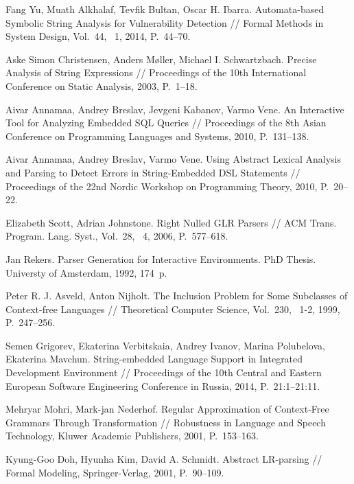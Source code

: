 \documentclass{llncs}
\begin{document}








%
%
\begin{thebibliography}{}
%
Fang Yu, Muath Alkhalaf, Tevfik Bultan, Oscar H. Ibarra.
Automata-based Symbolic String Analysis for Vulnerability Detection //
Formal Methods in System Design, Vol.~44, \textnumero~1, 2014, P.~44--70.

Aske Simon Christensen, Anders M{\o}ller, Michael I. Schwartzbach.
Precise Analysis of String Expressions //
Proceedings of the 10th International Conference on Static Analysis, 2003, P.~1--18.

Aivar Annamaa, Andrey Breslav, Jevgeni Kabanov, Varmo Vene.
An Interactive Tool for Analyzing Embedded SQL Queries //
Proceedings of the 8th Asian Conference on Programming Languages and Systems, 2010, P.~131--138.

Aivar Annamaa, Andrey Breslav, Varmo Vene. Using Abstract Lexical Analysis and Parsing to Detect 
Errors in String-Embedded DSL Statements // 
Proceedings of the 22nd Nordic Workshop on Programming Theory, 2010, P.~20--22. 

Elizabeth Scott, Adrian Johnstone.
Right Nulled GLR Parsers // ACM Trans. Program. Lang. Syst., Vol.~28, \textnumero~4,
2006, P.~577--618.

Jan Rekers.
Parser Generation for Interactive Environments. PhD Thesis. Universty of Amsterdam, 1992, 174~p.

Peter R. J. Asveld, Anton Nijholt.
The Inclusion Problem for Some Subclasses of Context-free Languages //
Theoretical Computer Science, Vol.~230, \textnumero~1-2, 1999, P.~247--256.

Semen Grigorev, Ekaterina Verbitskaia, Andrey Ivanov, Marina Polubelova, Ekaterina Mavchun.
String-embedded Language Support in Integrated Development Environment //
Proceedings of the 10th Central and Eastern European Software Engineering Conference in Russia, 2014, P.~21:1--21:11.

Mehryar Mohri, Mark-jan Nederhof.
Regular Approximation of Context-Free Grammars Through Transformation //
Robustness in Language and Speech Technology, Kluwer Academic Publishers, 2001, P.~153--163. 

Kyung-Goo Doh, Hyunha Kim, David A. Schmidt.
Abstract LR-parsing // Formal Modeling, Springer-Verlag, 2001, P.~90--109.


\end{thebibliography}
\end{document}
